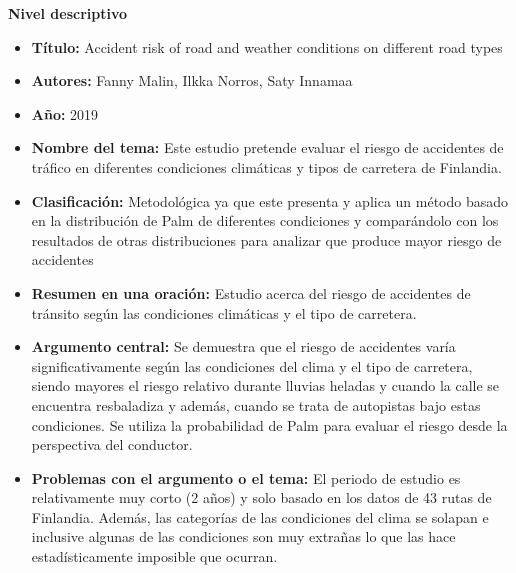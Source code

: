 \documentclass[12pt]{article}
\begin{document}
\textbf{Nivel descriptivo} 
\begin{itemize}
    \item \textbf{Título:} Accident risk of road and weather conditions on different road types
    
	\item \textbf{Autores:} Fanny Malin, Ilkka Norros, Saty Innamaa 
    
	\item \textbf{Año:} 2019
    
	\item \textbf{Nombre del tema:} Este estudio pretende evaluar el riesgo de accidentes de tráfico en diferentes condiciones climáticas y tipos de carretera de Finlandia.
	
    \item \textbf{Clasificación:} Metodológica ya que este presenta y aplica un método basado en la distribución de Palm de diferentes condiciones y comparándolo con los resultados de otras distribuciones para analizar que produce mayor riesgo de accidentes    
	
    \item \textbf{Resumen en una oración:} Estudio acerca del riesgo de accidentes de tránsito según las condiciones climáticas y el tipo de carretera. 

    \item \textbf{Argumento central:} Se demuestra que el riesgo de accidentes varía significativamente según las condiciones del clima y el tipo de carretera, siendo mayores el riesgo relativo durante lluvias heladas y cuando la calle se encuentra resbaladiza y además, cuando se trata de autopistas bajo estas condiciones. Se utiliza la probabilidad de Palm para evaluar el riesgo desde la perspectiva del conductor.  
 
    \item \textbf{Problemas con el argumento o el tema:} El periodo de estudio es 
    relativamente muy corto (2 años) y solo basado en los datos de 43 rutas de Finlandia. 
    Además, las categorías de las condiciones del clima se solapan e inclusive algunas de 
    las condiciones son muy extrañas lo que las hace estadísticamente imposible que ocurran. \\
\end{itemize}
\end{document}
